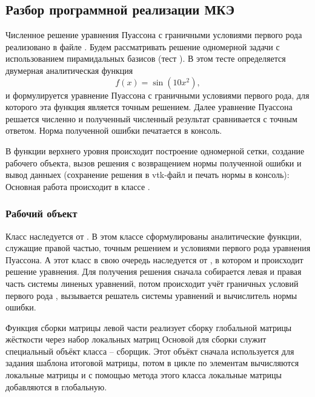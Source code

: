 \subsection{Разбор программной реализации МКЭ}
Численное решение уравнения Пуассона с граничными
условиями первого рода реализовано в файле
.
Будем рассматривать решение одномерной задачи с использованием пирамидальных базисов (тест ).
В этом тесте определяется двумерная аналитическая функция
$$
f(x) = \sin(10 x^2),
$$
и формулируется уравнение Пуассона с граничными условиями первого рода, для которого эта функция является точным решением.
Далее уравнение Пуассона решается численно и полученный численный результат сравнивается
с точным ответом. Норма полученной ошибки печатается в консоль.

В функции верхнего уровня происходит построение одномерной
сетки, создание рабочего объекта, вызов решения с возвращением нормы полученной ошибки
и вывод данныех (сохранение решения в vtk-файл и печать нормы в консоль):
Основная работа происходит в классе .

\subsubsection{Рабочий объект}
Класс 
наследуется от . В этом классе
сформулированы аналитические функции, служащие
правой частью, точным решением и условиями первого рода уравнения Пуассона.
А этот класс в свою очередь наследуется от ,
в котором и происходит решение уравнения.
Для получения решения сначала собирается левая и правая
часть системы линеных уравнений,
потом происходит учёт граничных условий первого рода
, вызывается решатель системы уравнений и вычислитель нормы ошибки.

Функция сборки матрицы левой части реализует сборку глобальной матрицы жёсткости
через набор локальных матриц
Основой для сборки служит специальный объёкт  класса
 -- сборщик.
Этот объёкт сначала используется для задания шаблона итоговой матрицы,
потом в цикле по элементам вычисляются локальные матрицы и с
помощью метода этого класса 
локальные матрицы добавляются в глобальную.


